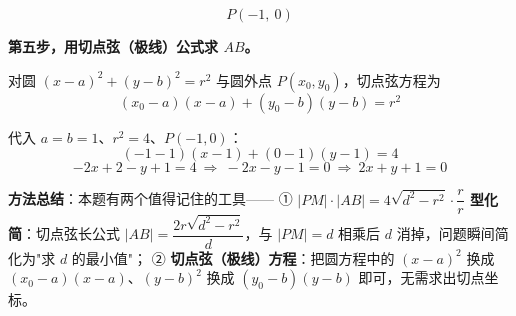 \begin{answer}
\nopagebreak[4]
\[P(-1,\ 0)\]

\textbf{第五步，用切点弦（极线）公式求 $AB$。}

对圆 $(x-a)^{2}+(y-b)^{2}=r^{2}$ 与圆外点 $P\left(x_0,y_0\right)$，切点弦方程为
\nopagebreak[4]
\[\left(x_0-a\right)(x-a)+\left(y_0-b\right)(y-b)=r^{2}\]

代入 $a=b=1$、$r^{2}=4$、$P(-1,0)$：
\nopagebreak[4]
\[(-1-1)(x-1)+(0-1)(y-1)=4\]
\nopagebreak[4]
\[-2x+2-y+1=4\ \Longrightarrow\ -2x-y-1=0\ \Longrightarrow\ 2x+y+1=0\]

\begin{gktip}
\textbf{方法总结}：本题有两个值得记住的工具——
① \textbf{$|PM|\cdot|AB|=4\sqrt{d^2-r^2}\cdot\dfrac{r}{r}$ 型化简}：切点弦长公式 $|AB|=\dfrac{2r\sqrt{d^{2}-r^{2}}}d$，与 $|PM|=d$ 相乘后 $d$ 消掉，问题瞬间简化为"求 $d$ 的最小值"；
② \textbf{切点弦（极线）方程}：把圆方程中的 $(x-a)^2$ 换成 $(x_0-a)(x-a)$、$(y-b)^2$ 换成 $(y_0-b)(y-b)$ 即可，无需求出切点坐标。
\end{gktip}


\par\medskip

\end{answer}
